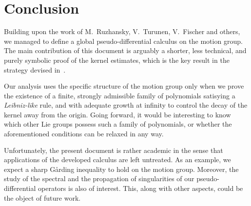 \chapter{Conclusion}

Building upon the work of M.~Ruzhansky, V.~Turunen, V.~Fischer and others,
we managed to define a global pseudo-differential calculus on the motion group.
The main contribution of this document is arguably a shorter, less technical, and purely symbolic proof of the kernel estimates,
which is the key result in the strategy devised in~\cite{FischerRuzhansky16}.

Our analysis uses the specific structure of the motion group
only when we prove the existence of a finite, strongly admissible family of polynomials satisying a \emph{Leibniz-like} rule,
and with adequate growth at infinity to control the decay of the kernel away from the origin.
Going forward,
it would be interesting to know which other Lie groups possess such a family of polynomials,
or whether the aforementioned conditions can be relaxed in any way.

Unfortunately,
the present document is rather academic
in the sense that applications of the developed calculus are left untreated.
As an example,
we expect a sharp Gårding inequality to hold on the motion group.
Moreover,
the study of the spectral and the propagation of singularities of our pseudo-differential operators is also of interest.
This, along with other aspects,
could be the object of future work.
